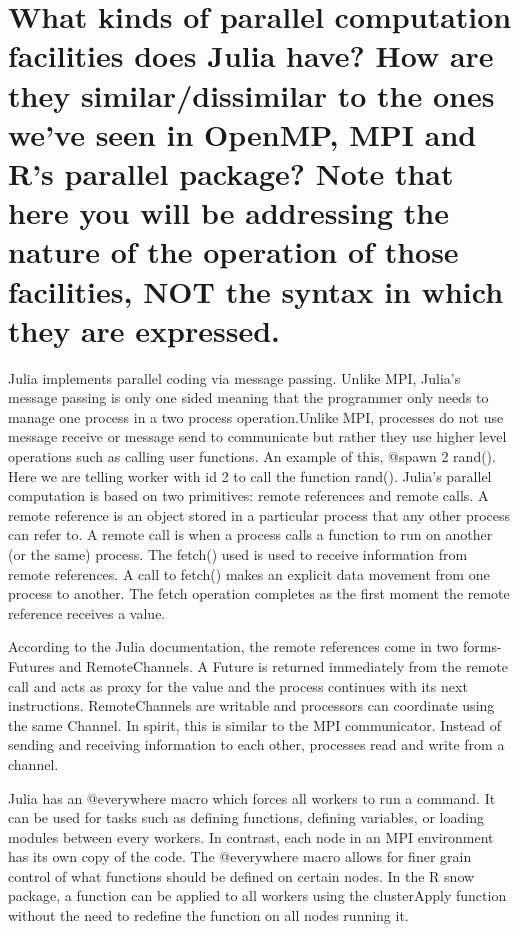 \documentclass[10pt]{article}
\begin{document}
\section*{\normalsize What kinds of parallel computation facilities does Julia have? How are they similar/dissimilar to the ones we've seen in OpenMP, MPI and R's parallel package? Note that here you will be addressing the nature of the operation of those facilities, NOT the syntax in which they are expressed. }

Julia implements parallel coding via message passing. Unlike MPI, Julia’s message passing is only one sided meaning that the programmer only needs to manage one process in a two process operation.Unlike MPI, processes do not use message receive or message send to communicate but rather they use higher level operations such as calling user functions. An example of this, @spawn 2 rand(). Here we are telling worker with id 2 to call the function rand(). Julia’s parallel computation is based on two primitives: remote references and remote calls. A remote reference is an object stored in a particular process that any other process can refer to. A remote call is when a process calls a function to run on another (or the same) process. The fetch() used is used to receive information from remote references. A call to fetch() makes an explicit data movement from one process to another. The fetch operation completes as the first moment the remote reference receives a value.

According to the Julia documentation, the remote references come in two forms- Futures and RemoteChannels. A Future is returned immediately from the remote call and acts as proxy for the value and the process continues with its next instructions. RemoteChannels are writable and processors can coordinate using the same Channel. In spirit, this is similar to the MPI communicator. Instead of sending and receiving information to each other, processes read and write from a channel. 

Julia has an @everywhere macro which forces all workers to run a command. It can be used for tasks such as defining functions, defining variables, or loading modules between every workers. In contrast, each node in an MPI environment has its own copy of the code. The @everywhere macro allows for finer grain control of what functions should be defined on certain nodes. In the R snow package, a function can be applied to all workers using the clusterApply function without the need to redefine the function on all nodes running it.
\end{document}
